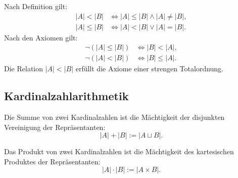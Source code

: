 Nach Definition gilt:
\begin{align}
|A|<|B| &\iff |A|\le |B|\land |A|\ne |B|,\\
|A|\le |B| &\iff |A|<|B|\lor |A|=|B|.
\end{align}
Nach den Axiomen gilt:
\begin{align}
\neg (|A|\le |B|) &\iff |B|<|A|,\\
\neg (|A|<|B|) &\iff |B|\le |A|.
\end{align}
Die Relation $|A|<|B|$ erfüllt die Axiome einer
strengen Totalordnung.

\subsection{Kardinalzahlarithmetik}
\begin{definition}
Die Summe von zwei Kardinalzahlen ist die Mächtigkeit
der disjunkten Vereinigung der Repräsentanten:%
\begin{equation}
|A|+|B| := |A\sqcup B|.
\end{equation}
\end{definition}

\begin{definition}
Das Produkt von zwei Kardinalzahlen ist die Mächtigkeit
des kartesischen Produktes der Repräsentanten:%
\begin{equation}
|A|\cdot |B| := |A\times B|.
\end{equation}
\end{definition}

